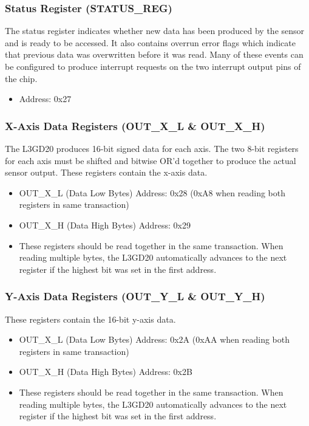 \documentclass[openany,11pt,fleqn]{book} %
\begin{document}
\subsubsection{Status Register (STATUS\_REG)}
The status register indicates whether new data has been produced by the sensor and is ready to be accessed. It also contains overrun error flags which indicate that previous data was overwritten before it was read. Many of these events can be configured to produce interrupt requests on the two interrupt output pins of the chip.
\begin{itemize}
    \item Address: 0x27
\end{itemize}

\subsubsection{X-Axis Data Registers (OUT\_X\_L \& OUT\_X\_H)}
The L3GD20 produces 16-bit signed data for each axis. The two 8-bit registers for each axis must be shifted and bitwise OR'd together to produce the actual sensor output. These registers contain the x-axis data. 
\begin{itemize}
    \item OUT\_X\_L (Data Low Bytes) Address: 0x28 (0xA8 when reading both registers in same transaction)
    \item OUT\_X\_H (Data High Bytes) Address: 0x29
    \item These registers should be read together in the same transaction. When reading multiple bytes, the L3GD20 automatically advances to the next register if the highest bit was set in the first address. 
\end{itemize} 

\subsubsection{Y-Axis Data Registers (OUT\_Y\_L \& OUT\_Y\_H)}
These registers contain the 16-bit y-axis data. 
\begin{itemize}
    \item OUT\_X\_L (Data Low Bytes) Address: 0x2A (0xAA when reading both registers in same transaction)
    \item OUT\_X\_H (Data High Bytes) Address: 0x2B
    \item These registers should be read together in the same transaction. When reading multiple bytes, the L3GD20 automatically advances to the next register if the highest bit was set in the first address. 
\end{itemize}
\end{document}
